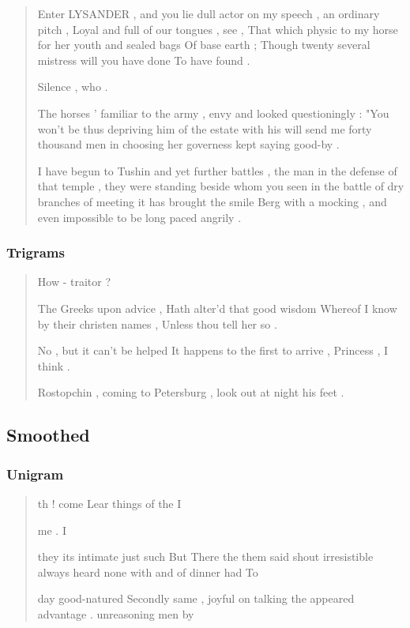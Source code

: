 \documentclass{article}
\begin{document}
			\begin{quote}

			Enter LYSANDER , and you lie dull actor on my speech , an ordinary
			pitch , Loyal and full of our tongues , see , That which physic to
			my horse for her youth and sealed bags Of base earth ; Though twenty
			several mistress will you have done To have found .

			Silence , who .

			The horses ' familiar to the army , envy and looked questioningly :
			"You won't be thus depriving him of the estate with his will send me
			forty thousand men in choosing her governess kept saying good-by .

			I have begun to Tushin and yet further battles , the man in the
			defense of that temple , they were standing beside whom you seen in
			the battle of dry branches of meeting it has brought the smile Berg
			with a mocking , and even impossible to be long paced angrily .

			\end{quote}

		\subsubsection*{Trigrams}

			\begin{quote}

			How - traitor ?

			The Greeks upon advice , Hath alter'd that good wisdom Whereof I know
			by their christen names , Unless thou tell her so .

			No , but it can't be helped It happens to the first to arrive ,
			Princess , I think .

			Rostopchin , coming to Petersburg , look out at night his feet .

			\end{quote}

	\subsection*{Smoothed}

		\subsubsection*{Unigram}

			\begin{quote}
			
			th ! come Lear things of the I

			me . I

			they its intimate just such But There the them said shout
			irresistible always heard none with and of dinner had To

			day good-natured Secondly same , joyful on talking the appeared
			advantage . unreasoning men by

			\end{quote}
\end{document}
